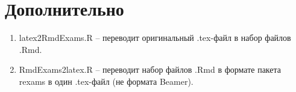 \documentclass[11pt, a4paper]{extarticle}
\newcommand{\form}[1]{{\color{magenta} #1}}
\begin{document}
\section{Дополнительно}

\begin{enumerate}
	\item \form{latex2RmdExams.R} – переводит оригинальный \form{.tex}-файл в набор файлов \form{.Rmd}.
	\item \form{RmdExams2latex.R} – переводит набор файлов \form{.Rmd} в формате пакета \form{rexams} в один \form{.tex}-файл (не формата Beamer).
\end{enumerate}
\end{document}

